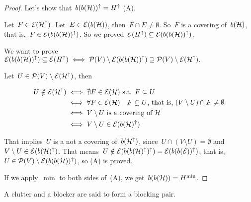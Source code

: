 \documentclass[main.tex]{subfiles}
\begin{document}
\begin{proof}
	Let's show that~$b(b(\mathcal{H}))^\uparrow = H^\uparrow$ (A).

	Let~$F \in \mathcal{E}(\mathcal{H}^\uparrow)$. Let~${E \in \mathcal{E}(b(\mathcal{H}))}$, then~${F \cap E \neq \emptyset}$. So~$F$ is a covering of~$b(\mathcal{H})$, that is,~${F \in \mathcal{E}(b(b(\mathcal{H}))^\uparrow)}$. So we proved~${\mathcal{E}(H^\uparrow) \subseteq \mathcal{E}(b(b(\mathcal{H}))^\uparrow)}$.

	We want to prove~${\mathcal{E}(b(b(\mathcal{H}))^\uparrow) \subseteq \mathcal{E}(H^\uparrow) \iff \mathcal{P}(V) \setminus \mathcal{E}(b(b(\mathcal{H}))^\uparrow) \supseteq \mathcal{P}(V) \setminus \mathcal{E}(\mathcal{H}^\uparrow).}$

	Let~${U \in \mathcal{P}(V) \setminus \mathcal{E}(\mathcal{H}^\uparrow)}$, then

	\begin{align*}
		U \notin \mathcal{E}(\mathcal{H}^\uparrow) & \iff \nexists F \in \mathcal{E}(\mathcal{H}) \text{ s.t. } F \subseteq U \\
		& \iff \forall F \in \mathcal{E}(\mathcal{H}) \quad F \subsetneq U \text{, that is, } (V \setminus U) \cap F \neq \emptyset \\
		& \iff V \setminus U \text{ is a covering of } \mathcal{H} \\
		& \iff V \setminus U \in \mathcal{E}(b(\mathcal{H})^\uparrow)
	\end{align*}

	That implies~$U$ is a not a covering of~$b(\mathcal{H}^\uparrow)$, since~$U \cap (V \setminus U) = \emptyset$ and~${V \setminus U \in \mathcal{E}(b(\mathcal{H})^\uparrow)}$. That means~${U \notin \mathcal{E}(b(b(\mathcal{H})^\uparrow)^\uparrow) = \mathcal{E}(b(b(\mathcal{E}))^\uparrow)}$, that is,~${U \in \mathcal{P}(V) \setminus \mathcal{E}(b(b(\mathcal{H}))^\uparrow)}$, so (A) is proved.

	If we apply~${\min}$ to both sides of~(A), we get~${b(b(\mathcal{H})) = H^{\min}}$.
\end{proof}

A clutter and a blocker are said to form a blocking pair.
\end{document}
